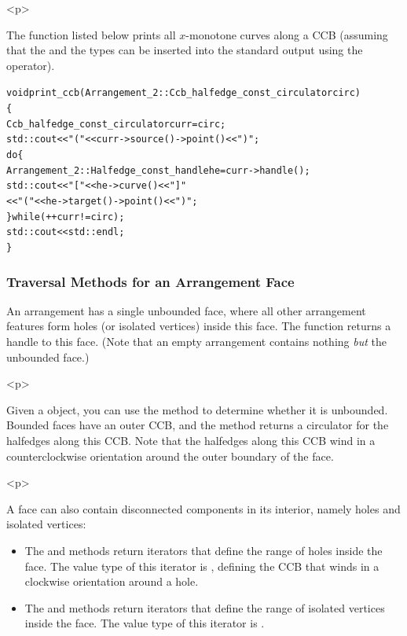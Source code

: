 \begin{ccHtmlOnly}<p>\end{ccHtmlOnly}
The function listed below prints all $x$-monotone curves along a CCB
(assuming that the  and the 
types can be inserted into the standard output using the \ccc{<<}
operator).
\begin{alltt}
void print_ccb (Arrangement_2::Ccb_halfedge_const_circulator circ)
\{
  Ccb_halfedge_const_circulator curr = circ;
  std::cout << "(" << curr->source()->point() << ")";
  do \{
    Arrangement_2::Halfedge_const_handle he = curr->handle();
    std::cout << "   [" << he->curve() << "]   "
              << "(" << he->target()->point() << ")";
  \} while (++curr != circ);
  std::cout << std::endl;
\}
\end{alltt}

\subsubsection{Traversal Methods for an Arrangement Face}
\label{arr_sssec:tr_face}
%
An arrangement has a single unbounded face, where all other
arrangement features form holes (or isolated vertices) inside this
face. The function  returns a handle to this
face. (Note that an empty arrangement contains nothing 
{\em but} the unbounded face.)

\begin{ccHtmlOnly}<p>\end{ccHtmlOnly}
Given a  object, you can use the 
method to determine whether it is unbounded. Bounded faces have an
outer CCB, and the  method returns a circulator
for the halfedges along this CCB. Note that the halfedges along
this CCB wind in a counterclockwise orientation around the outer
boundary of the face.

\begin{ccHtmlOnly}<p>\end{ccHtmlOnly}
A face can also contain disconnected components in its interior,
namely holes and isolated vertices:
\begin{itemize}
\item The  and  methods return
 iterators that define the range
of holes inside the face. The value type of this iterator is
, defining the CCB that winds in a
clockwise orientation around a hole.
\item The  and
 methods return
 iterators that
define the range of isolated vertices inside the face. The value
type of this iterator is .
\end{itemize}

